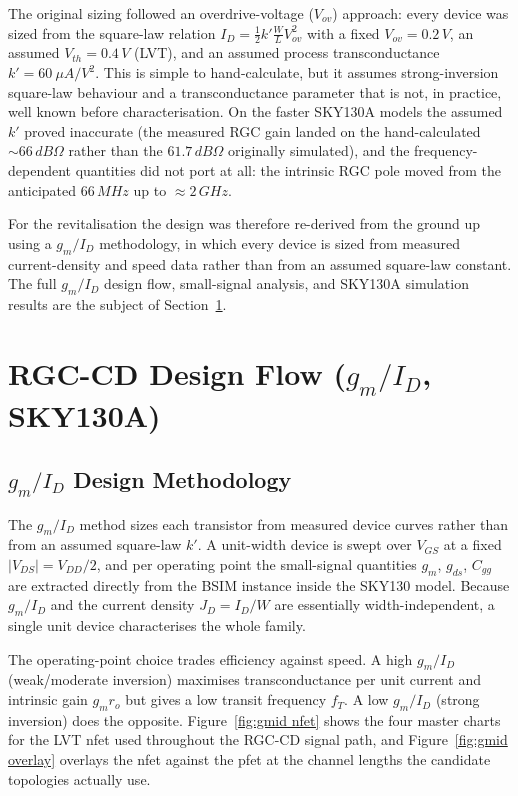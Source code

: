\documentclass{article}
\begin{document}
The original sizing followed an overdrive-voltage ($V_{ov}$) approach: every device
was sized from the square-law relation
$I_D=\tfrac{1}{2}k'\tfrac{W}{L}V_{ov}^2$ with a fixed $V_{ov}=0.2\,V$, an assumed
$V_{th}=0.4\,V$ (LVT), and an assumed process transconductance $k'=60\ \mu A/V^2$. This is
simple to hand-calculate, but it assumes strong-inversion square-law behaviour and a
transconductance parameter that is not, in practice, well known before characterisation. On
the faster SKY130A models the assumed $k'$ proved inaccurate (the measured RGC gain landed on
the hand-calculated $\sim66\,dB\Omega$ rather than the $61.7\,dB\Omega$ originally
simulated), and the frequency-dependent quantities did not port at all: the intrinsic RGC
pole moved from the anticipated $66\,MHz$ up to $\approx2\,GHz$.

For the revitalisation the design was therefore re-derived from the ground up using a
$g_m/I_D$ methodology, in which every device is sized from measured
current-density and speed data rather than from an assumed square-law constant. The full
$g_m/I_D$ design flow, small-signal analysis, and SKY130A simulation results are the subject
of Section~\ref{sec:flow}.

\section{RGC-CD Design Flow ($g_m/I_D$, SKY130A)}
\label{sec:flow}

\subsection{$g_m/I_D$ Design Methodology}
\label{sec:gmid}
The $g_m/I_D$ method sizes each transistor from measured device curves rather than from an
assumed square-law $k'$. A unit-width device is swept over $V_{GS}$ at a fixed
$|V_{DS}|=V_{DD}/2$, and per operating point the small-signal quantities $g_m$, $g_{ds}$,
$C_{gg}$ are extracted directly from the BSIM instance inside the SKY130 model. Because
$g_m/I_D$ and the current density $J_D=I_D/W$ are essentially width-independent, a single
unit device characterises the whole family.

The operating-point choice trades efficiency against speed. A high $g_m/I_D$
(weak/moderate inversion) maximises transconductance per unit current and intrinsic gain
$g_m r_o$ but gives a low transit frequency $f_T$. A low $g_m/I_D$ (strong inversion)
does the opposite. Figure~\ref{fig:gmid nfet} shows the four master charts for the LVT nfet
used throughout the RGC-CD signal path, and Figure~\ref{fig:gmid overlay} overlays the nfet
against the pfet at the channel lengths the candidate topologies actually use.
\end{document}
